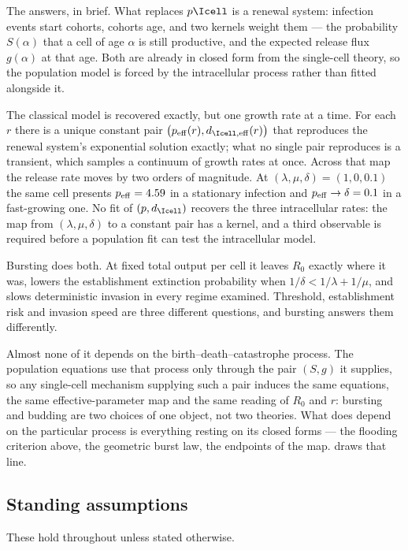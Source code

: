 The answers, in brief. What replaces $p\Icell$ is a renewal system:
infection events start cohorts, cohorts age, and two kernels weight them ---
the probability $S(\alpha)$ that a cell of age $\alpha$ is still productive,
and the expected release flux $g(\alpha)$ at that age. Both are already in
closed form from the single-cell theory, so the population model is forced
by the intracellular process rather than fitted alongside it.

The classical model is recovered exactly, but one growth rate at a time. For
each $r$ there is a unique constant pair
$\bigl(p_{\rm eff}(r),d_{\Icell,{\rm eff}}(r)\bigr)$ that reproduces the
renewal system's exponential solution exactly; what no single pair reproduces
is a transient, which samples a continuum of growth rates at once. Across
that map the release rate moves by two orders of magnitude. At
$(\lambda,\mu,\delta)=(1,0,0.1)$ the same cell presents
$p_{\rm eff}=4.59$ in a stationary infection and
$p_{\rm eff}\to\delta=0.1$ in a fast-growing one. No fit of
$(p,d_{\Icell})$ recovers the three intracellular rates: the map from
$(\lambda,\mu,\delta)$ to a constant pair has a kernel, and a third
observable is required before a population fit can test the intracellular
model.

Bursting does both. At fixed total output per cell it leaves $R_0$ exactly
where it was, lowers the establishment extinction probability when
$1/\delta<1/\lambda+1/\mu$, and slows deterministic invasion in every regime
examined. Threshold, establishment risk and invasion speed are three
different questions, and bursting answers them differently.

Almost none of it depends on the birth--death--catastrophe process. The
population equations use that process only through the pair $(S,g)$ it
supplies, so any single-cell mechanism supplying such a pair induces the
same equations, the same effective-parameter map and the same reading of
$R_0$ and $r$: bursting and budding are two choices of one object, not two
theories. What does depend on the particular process is everything resting
on its closed forms --- the flooding criterion above, the geometric burst
law, the endpoints of the map.  draws that line.

\subsection{Standing assumptions}
\label{p:sec:assumptions}

These hold throughout unless stated otherwise.

